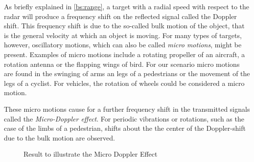 As briefly explained in \cref{bs:range}, a target with a radial speed with respect to the radar will produce a frequency shift on the reflected signal called the Doppler shift. This frequency shift is due to the so-called bulk motion of the object, that is the general velocity at which an object is moving. For many types of targets, however, oscillatory motions, which can also be called \textit{micro motions}, might be present. Examples of micro motions include a rotating propeller of an aircraft, a rotation antenna or the flapping wings of bird. For our scenario micro motions are found in the swinging of arms an legs of a pedestrians or the movement of the legs of a cyclist. For vehicles, the rotation of wheels could be considered a micro motion.

These micro motions cause for a further frequency shift in the transmitted signals called the \textit{Micro-Doppler effect}\cite{chen_micro-doppler_2011}. For periodic vibrations or rotations, such as the case of the limbs of a pedestrian, shifts about the the center of the Doppler-shift due to the bulk motion are observed. 

\begin{figure}[h!]
	\centering
	
	\caption{Result to illustrate the Micro Doppler Effect}
\end{figure} 